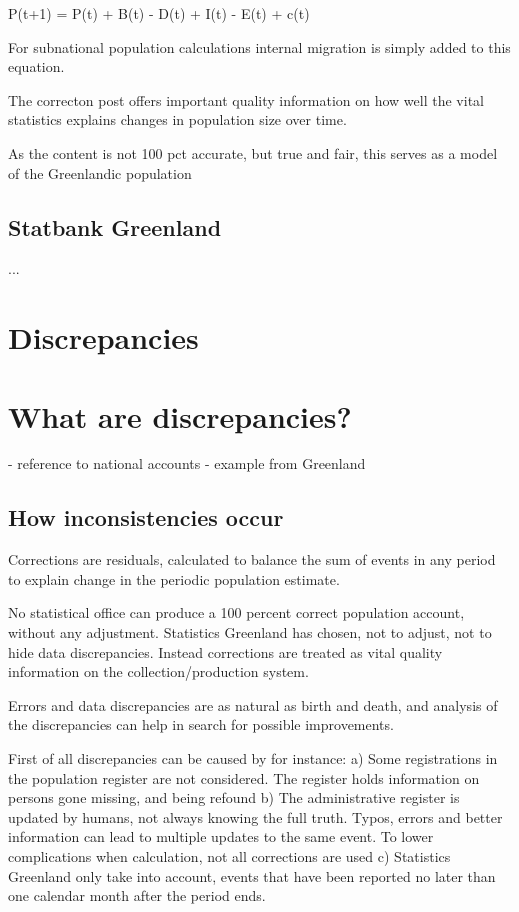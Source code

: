 \documentclass[USenglish]{article}
\begin{document}
P(t+1) = P(t) + B(t) - D(t) + I(t) - E(t) + c(t)


For subnational population calculations internal migration is simply added to this equation.

The correcton post offers important quality information on how well the vital statistics explains changes in population size over time.

As the content is not 100 pct accurate, but true and fair, this serves as a model of the Greenlandic population


\subsection{Statbank Greenland} 
...

\section{Discrepancies}

\section{What are discrepancies?}

- reference to national accounts
- example from Greenland



\subsection{How inconsistencies occur}

Corrections are residuals, calculated to balance the sum of events in any period to explain change in the periodic population estimate.

No statistical office can produce a 100 percent correct population account, without any adjustment. Statistics Greenland has chosen, not to adjust, not to hide data discrepancies. Instead corrections are treated as vital quality information on the collection/production system.

Errors and data discrepancies are as natural as birth and death, and analysis of the discrepancies can help in search for possible improvements.

First of all discrepancies can be caused by for instance: a) Some registrations in the population register are not considered. The register holds information on persons gone missing, and being refound b) The administrative register is updated by humans, not always knowing the full truth. Typos, errors and better information can lead to multiple updates to the same event. To lower complications when calculation, not all corrections are used c) Statistics Greenland only take into account, events that have been reported no later than one calendar month after the period ends.
\end{document}
